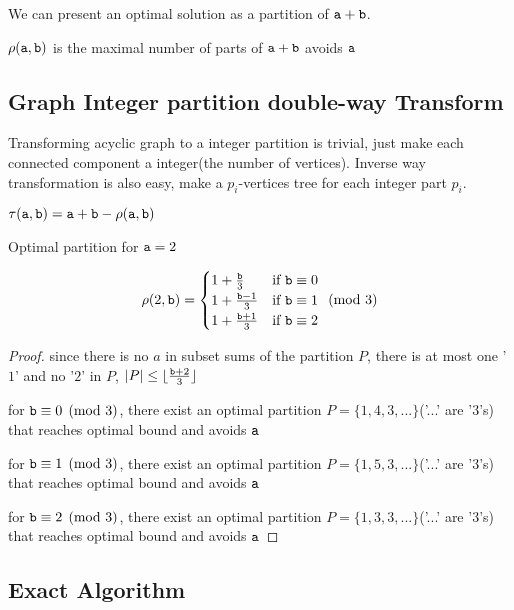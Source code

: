 \begin{definition}
We can present an optimal solution as a partition of $\mathtt{a}+\mathtt{b}$.

$\rho(\mathtt{a},\mathtt{b})$ is the maximal number of parts of $\mathtt{a}+\mathtt{b}$ avoids $\mathtt{a}$
\end{definition}
\subsection{Graph Integer partition double-way Transform}
Transforming acyclic graph to a integer partition is trivial, just make each connected component a integer(the number of vertices). Inverse way transformation is also easy, make a $p_i$-vertices tree for each integer part $p_i$. 
\begin{remark}
$\tau(\mathtt{a},\mathtt{b})=\mathtt{a}+\mathtt{b}-\rho(\mathtt{a},\mathtt{b})$
\end{remark}

\begin{theorem}
Optimal partition for $\mathtt{a}=2$

\[
 \rho(2,\mathtt{b}) =
   \begin{cases}
     1+\frac{\mathtt{b}}{3}   &\mbox{if }\mathtt{b}\equiv0\\
     1+\frac{\mathtt{b}-1}{3} &\mbox{if }\mathtt{b}\equiv1\\
     1+\frac{\mathtt{b}+1}{3} &\mbox{if }\mathtt{b}\equiv2
   \end{cases}
   \pmod{3}
\]
\end{theorem}

\begin{proof}
	since there is no $a$ in subset sums of the partition $P$, there is at most one '$1$' and no '$2$' in $P$, $|P|\leq \lfloor\frac{\mathtt{b}+2}{3}\rfloor$

	for $\mathtt{b}\equiv0\pmod{3}$, there exist an optimal partition $P=\{1,4,3,...\}$('...' are '$3$'s) that reaches optimal bound and avoids $\mathtt{a}$

	for $\mathtt{b}\equiv1\pmod{3}$, there exist an optimal partition $P=\{1,5,3,...\}$('...' are '$3$'s) that reaches optimal bound and avoids $\mathtt{a}$

	for $\mathtt{b}\equiv2\pmod{3}$, there exist an optimal partition $P=\{1,3,3,...\}$('...' are '$3$'s) that reaches optimal bound and avoids $\mathtt{a}$

\end{proof}


\subsection{Exact Algorithm}

